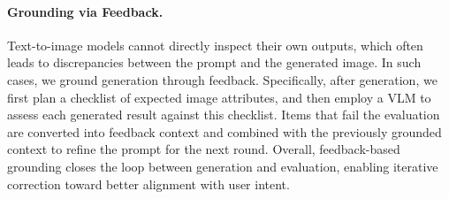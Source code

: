 \paragraph{Grounding via Feedback.}
Text-to-image models cannot directly inspect their own outputs, which often leads to discrepancies between the prompt and the generated image. In such cases, we ground generation through feedback. Specifically, after generation, we first plan a checklist of expected image attributes, and then employ a VLM to assess each generated result against this checklist. Items that fail the evaluation are converted into feedback context and combined with the previously grounded context to refine the prompt for the next round. Overall, feedback-based grounding closes the loop between generation and evaluation, enabling iterative correction toward better alignment with user intent.
